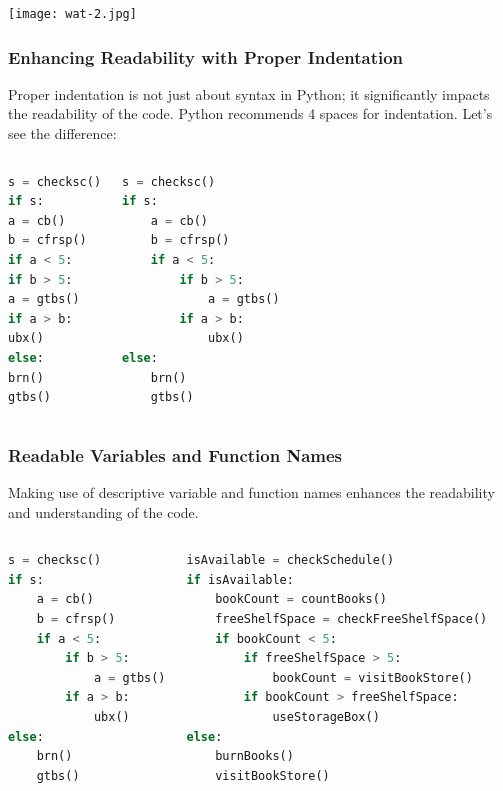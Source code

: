 \begin{frame}[plain]
\texttt{[image: wat-2.jpg]}
\end{frame}

\begin{frame}[fragile]
 \frametitle{Enhancing Readability with Proper Indentation}
 Proper indentation is not just about syntax in Python; it significantly impacts the readability of the code. Python recommends 4 spaces for indentation. Let's see the difference:
 \pause
 \begin{columns}[T]
     \begin{lstlisting}[language=Python]
s = checksc()
if s:
a = cb()
b = cfrsp()
if a < 5:
if b > 5:
a = gtbs()
if a > b:
ubx()
else:
brn()
gtbs()
 \end{lstlisting}
     \begin{lstlisting}[language=Python]
s = checksc()
if s:
    a = cb()
    b = cfrsp()
    if a < 5:
        if b > 5:
            a = gtbs()
        if a > b:
            ubx()
else:
    brn()
    gtbs()
 \end{lstlisting}
 \end{columns}
\end{frame}

\begin{frame}[fragile]
 \frametitle{Readable Variables and Function Names}
 Making use of descriptive variable and function names enhances the readability and understanding of the code. 
 \begin{columns}[T]
\begin{lstlisting}[language=Python]
s = checksc()
if s:
    a = cb()
    b = cfrsp()
    if a < 5:
        if b > 5:
            a = gtbs()
        if a > b:
            ubx()
else:
    brn()
    gtbs()
 \end{lstlisting}
     \begin{lstlisting}[language=Python]
isAvailable = checkSchedule()
if isAvailable:
    bookCount = countBooks()
    freeShelfSpace = checkFreeShelfSpace()
    if bookCount < 5:
        if freeShelfSpace > 5:
            bookCount = visitBookStore()
        if bookCount > freeShelfSpace:
            useStorageBox()
else:
    burnBooks()
    visitBookStore()
 \end{lstlisting}
 \end{columns}
\end{frame}

